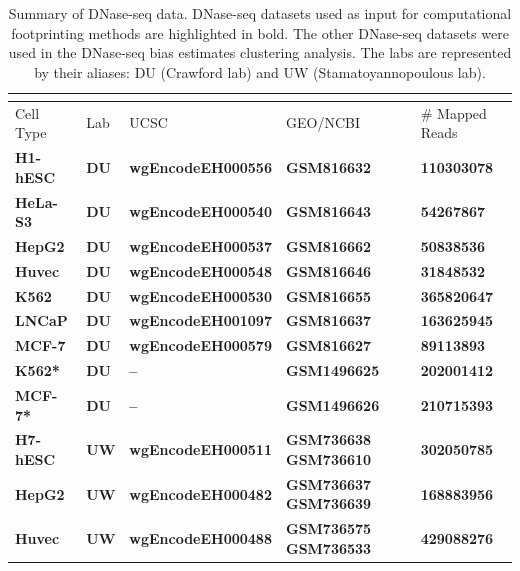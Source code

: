 \documentclass[11pt]{article}
\begin{document}
\clearpage

\begin{longtable}{p{3.5cm}p{1cm}p{4cm}p{2.8cm}p{3cm}}
\caption{Summary of DNase-seq data. DNase-seq datasets used as input for computational footprinting methods are highlighted in bold. The other DNase-seq datasets were used in the DNase-seq bias estimates clustering analysis. The labs are represented by their aliases: DU (Crawford lab) and UW (Stamatoyannopoulous lab).} \\
\label{tab:dataencode} \\
\hline
Cell Type & Lab                 & UCSC             & GEO/NCBI                     & \# Mapped Reads \\
\hline
\textbf{H1-hESC} & \textbf{DU} & \textbf{wgEncodeEH000556} & \textbf{GSM816632} & \textbf{110303078} \\
\textbf{HeLa-S3} & \textbf{DU} & \textbf{wgEncodeEH000540} & \textbf{GSM816643} & \textbf{54267867} \\
\textbf{HepG2} & \textbf{DU} & \textbf{wgEncodeEH000537} & \textbf{GSM816662} & \textbf{50838536} \\
\textbf{Huvec} & \textbf{DU} & \textbf{wgEncodeEH000548} & \textbf{GSM816646} & \textbf{31848532} \\
\textbf{K562} & \textbf{DU} & \textbf{wgEncodeEH000530} & \textbf{GSM816655} & \textbf{365820647} \\
\textbf{LNCaP} & \textbf{DU} & \textbf{wgEncodeEH001097} & \textbf{GSM816637} & \textbf{163625945} \\
\textbf{MCF-7} & \textbf{DU} & \textbf{wgEncodeEH000579} & \textbf{GSM816627} & \textbf{89113893} \\
\textbf{K562*} & \textbf{DU} & \textbf{--} & \textbf{GSM1496625} & \textbf{202001412} \\
\textbf{MCF-7*} & \textbf{DU} & \textbf{--} & \textbf{GSM1496626} & \textbf{210715393} \\
\textbf{H7-hESC} & \textbf{UW} & \textbf{wgEncodeEH000511} & \textbf{GSM736638} \newline \textbf{GSM736610} & \textbf{302050785} \\
\textbf{HepG2} & \textbf{UW} & \textbf{wgEncodeEH000482} & \textbf{GSM736637} \newline \textbf{GSM736639} & \textbf{168883956} \\
\textbf{Huvec} & \textbf{UW} & \textbf{wgEncodeEH000488} & \textbf{GSM736575} \newline \textbf{GSM736533} & \textbf{429088276} \\

\end{longtable}
\end{document}
